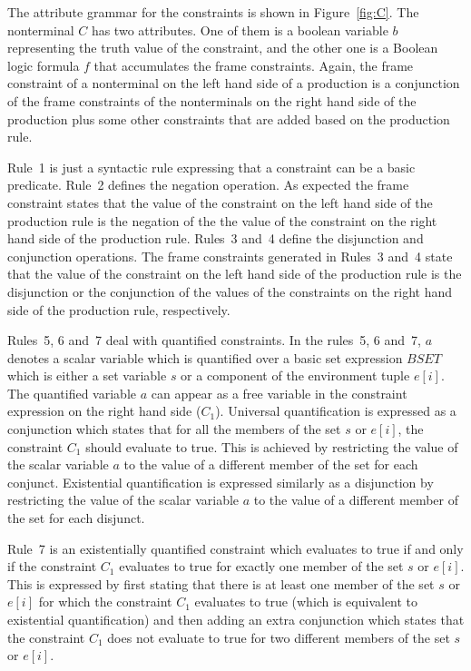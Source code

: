 The attribute grammar for the constraints is shown in
Figure~\ref{fig:C}.  The nonterminal $C$ has two attributes.  One of
them is a boolean variable $b$ representing the truth value of the
constraint, and the other one is a Boolean logic formula $f$ that
accumulates the frame constraints.  Again, the frame constraint of a
nonterminal on the left hand side of a production is a conjunction of
the frame constraints of the nonterminals on the right hand side of
the production plus some other constraints that are added based on the
production rule.

Rule~1 is just a syntactic rule expressing that a constraint can be a
basic predicate.  Rule~2 defines the negation operation.  As expected
the frame constraint states that the value of the constraint on the
left hand side of the production rule is the negation of the the value
of the constraint on the right hand side of the production rule.
Rules~3 and~4 define the disjunction and conjunction operations.  The
frame constraints generated in Rules~3 and~4 state that the value of
the constraint on the left hand side of the production rule is the
disjunction or the conjunction of the values of the constraints on the
right hand side of the production rule, respectively.

Rules~5, 6 and~7 deal with quantified constraints.  In the rules~5, 6
and~7, $a$ denotes a scalar variable which is quantified over a basic
set expression $BSET$ which is either a set variable $s$ or a
component of the environment tuple $e[i]$.  The quantified variable
$a$ can appear as a free variable in the constraint expression on the
right hand side ($C_1$).  Universal quantification is expressed as a
conjunction which states that for all the members of the set $s$ or
$e[i]$, the constraint $C_1$ should evaluate to true.  This is
achieved by restricting the value of the scalar variable $a$ to the
value of a different member of the set for each conjunct.  Existential
quantification is expressed similarly as a disjunction by restricting
the value of the scalar variable $a$ to the value of a different
member of the set for each disjunct.

Rule~7 is an existentially quantified constraint which evaluates to
true if and only if the constraint $C_1$ evaluates to true for exactly
one member of the set $s$ or $e[i]$.  This is expressed by first
stating that there is at least one member of the set $s$ or $e[i]$ for
which the constraint $C_1$ evaluates to true (which is equivalent to
existential quantification) and then adding an extra conjunction which
states that the constraint $C_1$ does not evaluate to true for two
different members of the set $s$ or $e[i]$.

